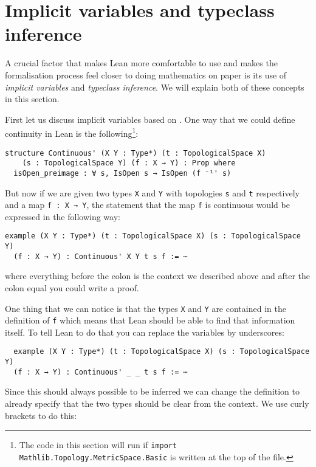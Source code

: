 \section{Implicit variables and typeclass inference}

A crucial factor that makes Lean more comfortable to use and makes the formalisation process feel closer to doing mathematics on paper is its use of \emph{implicit variables} and \emph{typeclass inference}. 
We will explain both of these concepts in this section.

First let us discuss implicit variables based on \cite{Avigad2024}. 
One way that we could define continuity in Lean is the following\cprotect\footnote{The code in this section will run if \lstinline{import Mathlib.Topology.MetricSpace.Basic} is written at the top of the file.}:

\begin{lstlisting}
structure Continuous' (X Y : Type*) (t : TopologicalSpace X) 
    (s : TopologicalSpace Y) (f : X → Y) : Prop where
  isOpen_preimage : ∀ s, IsOpen s → IsOpen (f ⁻¹' s)
\end{lstlisting}

But now if we are given two types \lstinline{X} and \lstinline{Y} with topologies \lstinline{s} and \lstinline{t} respectively and a map \lstinline{f : X → Y}, the statement that the map \lstinline{f} is continuous would be expressed in the following way:

\begin{lstlisting}
example (X Y : Type*) (t : TopologicalSpace X) (s : TopologicalSpace Y) 
  (f : X → Y) : Continuous' X Y t s f := ⋯
\end{lstlisting}

where everything before the colon is the context we described above and after the colon equal you could write a proof.

One thing that we can notice is that the types \lstinline{X} and \lstinline{Y} are contained in the definition of \lstinline{f} which means that Lean should be able to find that information itself. 
To tell Lean to do that you can replace the variables by underscores: 

\begin{lstlisting}
  example (X Y : Type*) (t : TopologicalSpace X) (s : TopologicalSpace Y) 
  (f : X → Y) : Continuous' _ _ t s f := ⋯
\end{lstlisting}

Since this should always possible to be inferred we can change the definition to already specify that the two types should be clear from the context. 
We use curly brackets to do this: 

